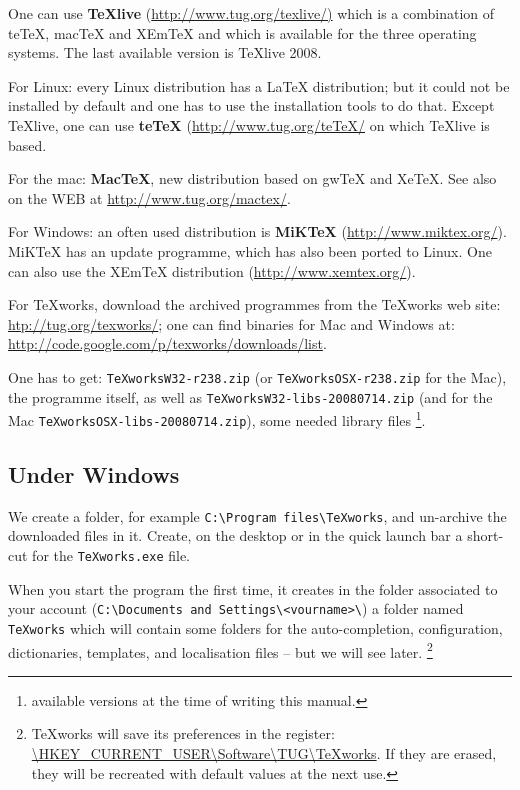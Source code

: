 \documentclass[11pt]{article}
\begin{document}
One can use \textbf{TeXlive} (\url{http://www.tug.org/texlive/)} which is a combination of teTeX, macTeX and XEmTeX and which is available for the three operating systems. The last available version is TeXlive 2008.

For Linux: every Linux distribution has a \LaTeX{} distribution; but it could not be installed by default and one has to use the installation tools to do that. Except TeXlive, one can use \textbf{teTeX} (\url{http://www.tug.org/teTeX/} on which TeXlive is based.

For the mac: \textbf{MacTeX}, new distribution based on gwTeX and XeTeX. See also on the WEB at \url{http://www.tug.org/mactex/}.

For Windows: an often used distribution is \textbf{MiKTeX} (\url{http://www.miktex.org/}). MiKTeX has an update programme, which has also been ported to Linux. One can also use the XEmTeX distribution (\url{http://www.xemtex.org/}).

For \TeX works, download the archived programmes from the \TeX works web site: \url{htp://tug.org/texworks/}; one can find binaries for Mac and Windows at: \url{http://code.google.com/p/texworks/downloads/list}.

One has to get: \verb|TeXworksW32-r238.zip| (or \verb|TeXworksOSX-r238.zip| for the Mac), the programme itself, as well as \verb|TeXworksW32-libs-20080714.zip| (and for the Mac \verb|TeXworksOSX-libs-20080714.zip|), some needed library files \footnote{available versions at the time of writing this manual.}.

\subsection{Under Windows}

We create a folder, for example \verb+C:\Program files\TeXworks+, and un-archive the downloaded files in it. Create, on the desktop or in the quick launch bar a short-cut for the \verb+TeXworks.exe+ file.

When you start the program the first time, it creates in the folder associated to your account (\verb+C:\Documents and Settings\<vourname>\+) a folder named \verb+TeXworks+ which will contain some folders for the auto-completion, configuration, dictionaries, templates, and localisation files -- but we will see later. \footnote{\TeX works will save its preferences in the register:
\url{\HKEY_CURRENT_USER\Software\TUG\TeXworks}. If they are erased, they will be recreated with default values at the next use.}
\end{document}
